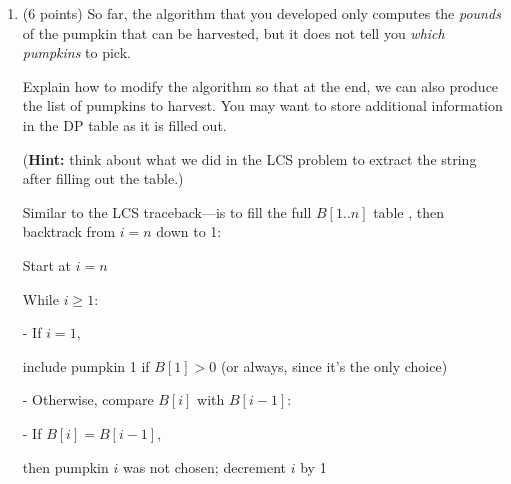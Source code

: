 \begin{enumerate}
\begin{solution}
    The runtime of the algorithm is \[ \mathcal{O}(n) \]
    
    \textbf{Justification}
    
    The algorithm processes the array \( A \) of size \( n \) in a single pass
    
    After handling the base cases (which take constant time), it iterates from index 3 to \( n \), 
    
    Performing a constant amount of work in each iteration (a comparison, an addition, and a couple of assignments)
    
    
    Therefore, the total number of operations is proportional to \( n \), yielding a time complexity of \( O(n) \)
    
    
    \end{solution}
    
    
    \item (6 points) 
    So far, the algorithm that you developed only computes the \emph{pounds} of the pumpkin that can be harvested, but it does not tell you \emph{which pumpkins} to pick.

    Explain how to modify the algorithm so that at the end, we can also produce the list of pumpkins to harvest.
    You may want to store additional information in the DP table as it is filled out.
    
    (\textbf{Hint:} think about what we did in the LCS problem to extract the string after filling out the table.)
\begin{solution}
\vspace{0.5cm}

Similar to the LCS traceback—is to fill the full \( B[1..n] \) table , then backtrack from \( i = n \) down to 1:

Start at \( i = n \)

While \( i \geq 1 \):

  - If \( i = 1 \), 
  
  \hspace{1cm } include pumpkin 1 if \( B[1] > 0 \) (or always, since it’s the only choice)


  \vspace{0.5cm}
  
  - Otherwise, compare \( B[i] \) with \( B[i-1] \):
  
    - If \( B[i] = B[i-1] \), 
    
    \hspace{1cm} then pumpkin \( i \) was not chosen; decrement \( i \) by 1
    

\end{solution}
\end{enumerate}
